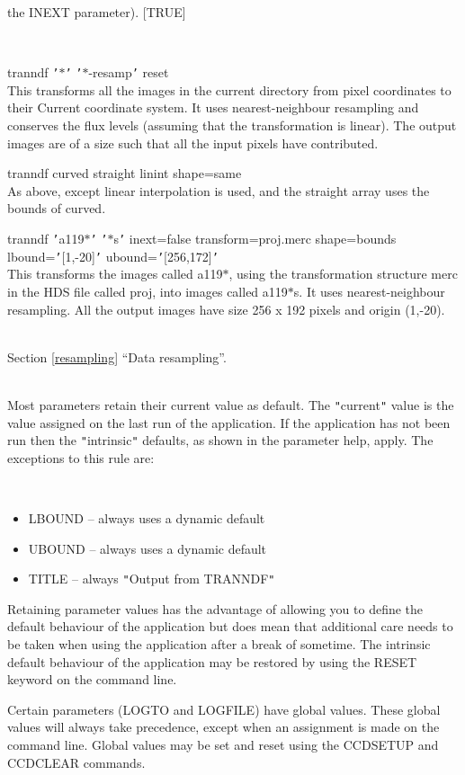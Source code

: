 \documentclass[twoside,11pt]{article}
\newcommand{\htmlref}[2]{#1}
\newcommand{\latexhtml}[2]{#1}
\renewcommand{\_}{\texttt{\symbol{95}}}
\newcommand{\qt}[1]{{\tt "}#1{\tt "}}
\newcommand{\qs}[1]{{\tt '}#1{\tt '}}
\newcommand{\xroutine}[1]{\htmlref{{\sc #1}}{#1}}
\newcommand{\secref}[2]{\latexhtml{Section \ref{#1} ``#2''}{``\htmlref{#2}{#1}''}}
\newcommand{\sstexamples}[1]{
   \item[Examples:] \mbox{} \\
   \vspace{-3.5ex}
   \begin{description}
      #1
   \end{description}
}
\newcommand{\sstexamplesubsection}[2]{\sloppy \item{\ssttt #1} \mbox{} \\ #2 }
\newcommand{\sstdiytopic}[2]{\item[#1:] \mbox{} \\[1.3ex] #2}
\newcommand{\sstimplementationstatus}[1]{
   \item[{Implementation Status:}] \mbox{} \\[1.3ex] #1}
\newcommand{\sstitemlist}[1]{
  \mbox{} \\
  \vspace{-3.5ex}
  \begin{itemize}
     #1
  \end{itemize}
}
\newcommand{\sstitem}{\item}
\newcommand{\sstexamples}[1]{
      \item[Examples:] \\
      \begin{description}
         #1
      \end{description}
      \\
   }
\newcommand{\sstexamplesubsection}[2]{\item[{\ssttt #1}] #2}
\newcommand{\sstdiytopic}[2]{\item[{#1:}] #2 }
\newcommand{\sstimplementationstatus}[1]{
      \item[Implementation Status:] #1
   }
\newcommand{\sstitemlist}[1]{
      \begin{itemize}
         #1
      \end{itemize}
      \\
   }
\newcommand{\sstitem}{\item}
\begin{document}
{{{         the INEXT parameter). [TRUE]
      }
   }
   \sstexamples{
      \sstexamplesubsection{
         tranndf \qs{$*$} \qs{$*$-resamp} reset
      }{
         This transforms all the images in the current directory from
         pixel coordinates to their Current coordinate system.
         It uses nearest-neighbour resampling and conserves the flux
         levels (assuming that the transformation is linear).
         The output images are of a size such that all the input
         pixels have contributed.
      }
      \sstexamplesubsection{
         tranndf curved straight linint shape=same
      }{
         As above, except linear interpolation is used, and the straight
         array uses the bounds of curved.
      }
      \sstexamplesubsection{
         tranndf \qs{a119$*$} \qs{$*$s} inext=false transform=proj.merc
            shape=bounds lbound=\qs{[1,-20]} ubound=\qs{[256,172]}
      }{
         This transforms the images called a119$*$, using the transformation
         structure merc in the HDS file called proj, into images called 
         a119$*$s.  It uses nearest-neighbour resampling.  All the output 
         images have size 256 x 192 pixels and origin (1,-20).
      }
   }
   \sstdiytopic{
      See also
   } {
      \secref{resampling}{Data resampling}.
   }
   \sstdiytopic{
      Behaviour of parameters
   }{
      Most parameters retain their current value as default. The
      \qt{current} value is the value assigned on the last run of the
      application. If the application has not been run then the
      \qt{intrinsic} defaults, as shown in the parameter help, apply.
      The exceptions to this rule are:
      \sstitemlist{

         \sstitem
            LBOUND  -- always uses a dynamic default

         \sstitem
            UBOUND  -- always uses a dynamic default

         \sstitem
            TITLE   -- always \qt{Output from TRANNDF}

      }
      Retaining parameter values has the advantage of allowing you to
      define the default behaviour of the application but does mean
      that additional care needs to be taken when using the application
      after a break of sometime. The intrinsic default behaviour of
      the application may be restored by using the RESET keyword on
      the command line.

      Certain parameters (LOGTO and LOGFILE) have global values. These
      global values will always take precedence, except when an
      assignment is made on the command line.  Global values may be set
      and reset using the \xroutine{CCDSETUP} and \xroutine{CCDCLEAR} commands.
   }
   \sstimplementationstatus{
      \sstitemlist{

}}}
\end{document}
